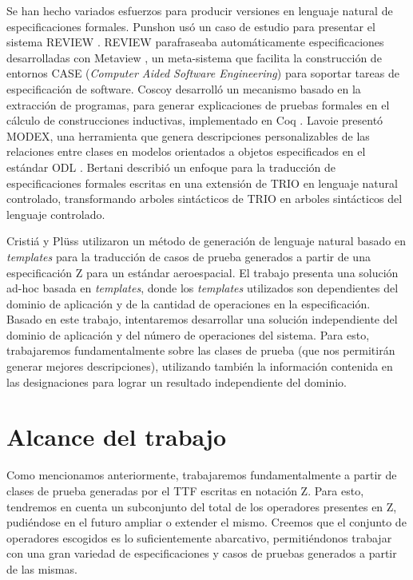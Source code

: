 Se han hecho variados esfuerzos para producir versiones en lenguaje natural de especificaciones formales. Punshon \cite{punshon} usó un caso de estudio para presentar el sistema REVIEW \cite{review}. REVIEW parafraseaba automáticamente especificaciones desarrolladas con Metaview \cite{metaview}, un meta-sistema que facilita la construcción de entornos CASE (\textit{Computer Aided Software Engineering}) para soportar tareas de especificación de software. Coscoy \cite{coscoy} desarrolló un mecanismo basado en la extracción de programas, para generar explicaciones de pruebas formales en el cálculo de construcciones inductivas, implementado en Coq \cite{coq}. Lavoie \cite{lavoie} presentó MODEX, una herramienta que genera descripciones personalizables de las relaciones entre clases en modelos orientados a objetos especificados en el estándar ODL \cite{odl}. Bertani \cite{bertani} describió un enfoque para la traducción de especificaciones formales escritas en una extensión de TRIO \cite{trio} en lenguaje natural controlado, transformando arboles sintácticos de TRIO en arboles sintácticos del lenguaje controlado.  

Cristiá y Plüss \cite{cristia_pluss} utilizaron un método de generación de lenguaje natural basado en \textit{templates} para la traducción de casos de prueba generados a partir de una especificación Z para un estándar aeroespacial. El trabajo presenta una solución ad-hoc basada en \textit{templates}, donde los \textit{templates} utilizados son dependientes del dominio de aplicación y de la cantidad de operaciones en la especificación. Basado en este trabajo, intentaremos desarrollar una solución independiente del dominio de aplicación y del número de operaciones del sistema. Para esto, trabajaremos fundamentalmente sobre las clases de prueba (que nos permitirán generar mejores descripciones), utilizando también la información contenida en las designaciones para lograr un resultado independiente del dominio.

\section{Alcance del trabajo}

Como mencionamos anteriormente, trabajaremos fundamentalmente a partir de clases de prueba generadas por el TTF escritas en notación Z.
Para esto, tendremos en cuenta un subconjunto del total de los operadores presentes en Z, pudiéndose en el futuro ampliar o extender el mismo. Creemos que el conjunto de operadores escogidos es lo suficientemente abarcativo, permitiéndonos trabajar con una gran variedad de especificaciones y casos de pruebas generados a partir de las mismas.


